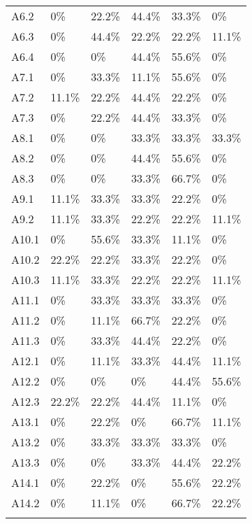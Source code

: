 \begin{longtable}{  p{}   p{}  p{}  p{}  p{}  p{} }
      A6.2 & 0\% & 22.2\% & 44.4\% &  33.3\% & 0\%
     \\ 
    A6.3 & 0\% & 44.4\% & 22.2\% & 22.2\%  &  11.1\%   
    \\ 
    A6.4 & 0\% & 0\%  & 44.4\%  & 55.6\%  & 0\% 
    \\
     \hline
      A7.1 & 0\% & 33.3\% & 11.1\% & 55.6\% & 0\% 
      \\
      A7.2 & 11.1\% & 22.2\% & 44.4\% & 22.2\% & 0\%
     \\ 
    A7.3 & 0\% & 22.2\% & 44.4\% & 33.3\%  &  0\%   
    \\ 
    \hline
      A8.1 & 0\% & 0\% & 33.3\% & 33.3\% & 33.3\% 
      \\
      A8.2 & 0\% & 0\% & 44.4\% & 55.6\% & 0\%
     \\ 
    A8.3 & 0\% & 0\% & 33.3\% & 66.7\%  &  0\%   
    \\ 
    \hline
      A9.1 & 11.1\% & 33.3\% & 33.3\% & 22.2\% & 0\% 
      \\
      A9.2 & 11.1\% & 33.3\% & 22.2\% & 22.2\% & 11.1\%
     \\ 
     \hline
      A10.1 & 0\% & 55.6\% & 33.3\% & 11.1\% & 0\% 
      \\
      A10.2 & 22.2\% & 22.2\% & 33.3\% & 22.2\% & 0\%
     \\ 
    A10.3 & 11.1\% & 33.3\% & 22.2\% & 22.2\%  &  11.1\%   
    \\ 
     \hline
      A11.1 & 0\% & 33.3\% & 33.3\% & 33.3\% & 0\% 
      \\
      A11.2 & 0\% & 11.1\% & 66.7\% & 22.2\% & 0\%
     \\ 
    A11.3 &  0\% & 33.3\% & 44.4\% & 22.2\% & 0\%   
    \\ 
     \hline
      A12.1 & 0\% & 11.1\% & 33.3\% & 44.4\% & 11.1\% 
      \\
      A12.2 & 0\% & 0\% & 0\% & 44.4\% & 55.6\%
     \\ 
    A12.3 & 22.2\% & 22.2\% & 44.4\% & 11.1\% & 0\%   
    \\ 
    \hline
      A13.1 & 0\% & 22.2\% & 0\% & 66.7\% & 11.1\% 
      \\
      A13.2 & 0\% & 33.3\% & 33.3\% & 33.3\% & 0\%
     \\ 
    A13.3 & 0\% &  0\% & 33.3\% & 44.4\% & 22.2\%   
    \\ 
    \hline
      A14.1 & 0\% & 22.2\% & 0\% & 55.6\% & 22.2\% 
      \\
      A14.2 & 0\% & 11.1\% & 0\% & 66.7\% & 22.2\%
     \\ 
    \bottomrule 
    \label{tab:AttributionResponsesFrequencies}  
\end{longtable}

